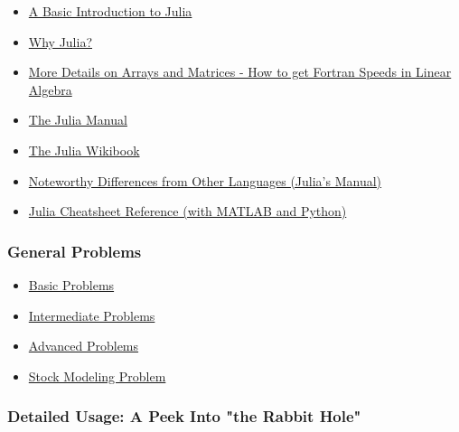 \documentclass[11pt]{article}
\providecommand{\tightlist}{%
      \setlength{\itemsep}{0pt}\setlength{\parskip}{0pt}}
\begin{document}
\begin{itemize}
\tightlist
\item
  \href{http://ucidatascienceinitiative.github.io/IntroToJulia/Html/BasicIntroduction}{A
  Basic Introduction to Julia}
\item
  \href{http://ucidatascienceinitiative.github.io/IntroToJulia/Html/WhyJulia}{Why
  Julia?}
\item
  \href{http://ucidatascienceinitiative.github.io/IntroToJulia/Html/ArraysAndMatrices}{More
  Details on Arrays and Matrices - How to get Fortran Speeds in Linear
  Algebra}
\item
  \href{https://docs.julialang.org/en/stable/}{The Julia Manual}
\item
  \href{https://en.wikibooks.org/wiki/Introducing_Julia}{The Julia
  Wikibook}
\item
  \href{https://docs.julialang.org/en/stable/manual/noteworthy-differences/}{Noteworthy
  Differences from Other Languages (Julia's Manual)}
\item
  \href{https://cheatsheets.quantecon.org/}{Julia Cheatsheet Reference
  (with MATLAB and Python)}
\end{itemize}

\subsubsection{General Problems}\label{general-problems}

\begin{itemize}
\tightlist
\item
  \href{http://ucidatascienceinitiative.github.io/IntroToJulia/Html/BasicProblems}{Basic
  Problems}
\item
  \href{http://ucidatascienceinitiative.github.io/IntroToJulia/Html/IntermediateProblems}{Intermediate
  Problems}
\item
  \href{http://ucidatascienceinitiative.github.io/IntroToJulia/Html/AdvancedProblems}{Advanced
  Problems}
\item
  \href{http://ucidatascienceinitiative.github.io/IntroToJulia/Html/StockProblem}{Stock
  Modeling Problem}
\end{itemize}

\subsubsection{Detailed Usage: A Peek Into "the Rabbit
Hole"}\label{detailed-usage-a-peek-into-the-rabbit-hole}
\end{document}
